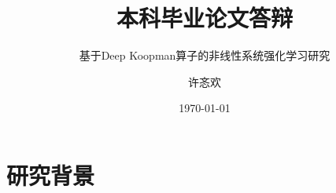 \documentclass{ldr-simple-gray}
\title{本科毕业论文答辩}
\subtitle{基于Deep Koopman算子的非线性系统强化学习研究}
\author{许忞欢}
\institute[]
{
导师：赵东东\\
兰州大学\quad 信息科学与工程学院
}
\date{\today}
\begin{document}
\frame{\titlepage}


\section{研究背景}

\end{document}

